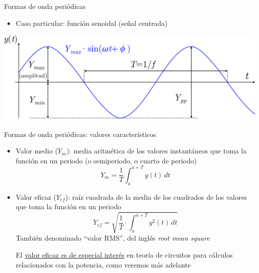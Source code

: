 \documentclass[aspectratio=169, usenames,svgnames,dvipsnames]{beamer}
\begin{document}

\begin{frame}{Formas de onda periódicas}
\vspace{1mm}
    \begin{itemize}
		\item Caso particular: \alert{función senoidal} (señal centrada)
    \end{itemize}

    \vspace{3mm}
    \begin{center}
        \includegraphics[width=.9\linewidth]{../figs/Senoidal_parametros.pdf}
    \end{center}   
\end{frame}


\begin{frame}{Formas de onda periódicas: \hspace{3mm}valores característicos}
    \vspace{1mm}
    \begin{itemize}
        \item \alert{Valor medio ($Y_m$)}: media aritmética de los valores instantáneos que toma la función en un periodo (o semiperiodo, o cuarto de periodo) 
        \begin{equation*}
            \boxed{Y_m=\frac{1}{T}\int_{a}^{a+T}y(t)\, dt}
        \end{equation*}
        \item \alert{Valor eficaz ($Y_{ef}$)}: raíz cuadrada de la media de los cuadrados de los valores que toma la función en un periodo
        \begin{equation*}
            \boxed{Y_{ef} = \sqrt{\frac{1}{T}\cdot\int_{a}^{a+T}y^{2}(t)\, dt}}
        \end{equation*}
        También denominado ``valor RMS'', del inglés \textit{root mean square}

        \vspace{3mm}
        El \underline{valor eficaz es de especial interés} en teoría de circuitos para \alert{cálculos relacionados con la potencia}, como veremos más adelante
	\end{itemize}
\end{frame}
\end{document}
